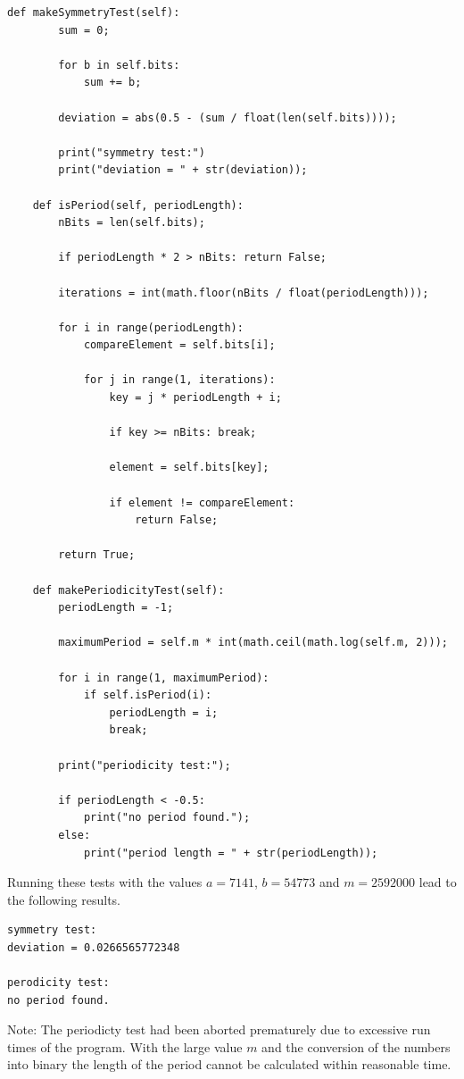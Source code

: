 \begin{lstlisting}[caption=Problem 3.6 b)]
	def makeSymmetryTest(self):
		sum = 0;
		
		for b in self.bits:
			sum += b;
		
		deviation = abs(0.5 - (sum / float(len(self.bits))));
		
		print("symmetry test:")
		print("deviation = " + str(deviation));
	
	def isPeriod(self, periodLength):
		nBits = len(self.bits);
		
		if periodLength * 2 > nBits: return False;
		
		iterations = int(math.floor(nBits / float(periodLength)));
		
		for i in range(periodLength):
			compareElement = self.bits[i];
		
			for j in range(1, iterations):
				key = j * periodLength + i;
				
				if key >= nBits: break;
				
				element = self.bits[key];
				
				if element != compareElement:
					return False;
		
		return True;
	
	def makePeriodicityTest(self):
		periodLength = -1;
		
		maximumPeriod = self.m * int(math.ceil(math.log(self.m, 2)));
		
		for i in range(1, maximumPeriod):
			if self.isPeriod(i):
				periodLength = i;
				break;
		
		print("periodicity test:");
		
		if periodLength < -0.5:
			print("no period found.");
		else:
			print("period length = " + str(periodLength));
\end{lstlisting}

Running these tests with the values $a = 7141$, $b = 54773$ and $m = 2592000$ lead to the following results.


\begin{lstlisting}[caption=Result of 3.6 b), keywordstyle=\color{black}]
symmetry test:
deviation = 0.0266565772348

perodicity test:
no period found.
\end{lstlisting}

Note: The periodicty test had been aborted prematurely due to excessive run times of the program. With the large value $m$ and the conversion of the numbers into binary the length of the period cannot be calculated within reasonable time.


